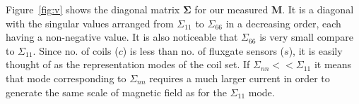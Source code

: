 

 
Figure~\ref{fig:v} shows the diagonal matrix $\bm{\Sigma}$ for our measured $\bm{M}$. It is a diagonal with the singular values arranged from $\Sigma_{11}$ to $\Sigma_{66}$ in a decreasing order, each having a non-negative value. It is also noticeable that $\Sigma_{66}$ is very small compare to $\Sigma_{11}$. Since no. of coils ($c$) is less than no. of fluxgate sensors ($s$), it is easily thought of as the representation modes of the coil set. If $\Sigma_{nn}<<\Sigma_{11}$ it means that mode corresponding to  $\Sigma_{nn}$ requires a much larger current in order to generate the same scale of magnetic field as for the $\Sigma_{11}$ mode. 



